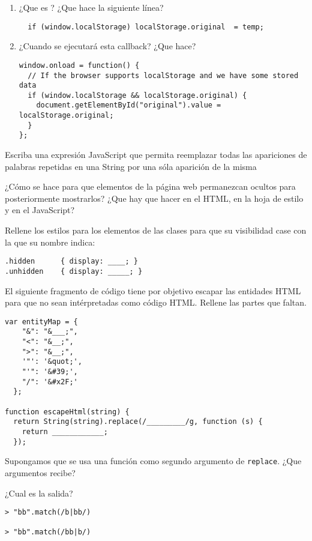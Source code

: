 \item 
\begin{enumerate}
\item 
¿Que es ? ¿Que hace la siguiente línea?
\begin{verbatim}
  if (window.localStorage) localStorage.original  = temp;
\end{verbatim}
\item  ¿Cuando se ejecutará esta callback? ¿Que hace?
\begin{verbatim}
window.onload = function() {
  // If the browser supports localStorage and we have some stored data
  if (window.localStorage && localStorage.original) {
    document.getElementById("original").value = localStorage.original;
  }
};
\end{verbatim}
\end{enumerate}

\item 
Escriba una expresión JavaScript que permita reemplazar todas las apariciones de palabras repetidas en una String por una sóla aparición de la misma
\item  ¿Cómo se hace para que elementos de la página web permanezcan ocultos para 
posteriormente mostrarlos? ¿Que hay que hacer en el HTML, en la hoja de estilo y en el JavaScript?
\item Rellene los estilos para los elementos de las clases para que su visibilidad
case con la que su nombre indica:
\begin{verbatim}
.hidden      { display: ____; }
.unhidden    { display: _____; }
\end{verbatim}
\item  El siguiente fragmento de código tiene por objetivo
escapar las entidades HTML para que no sean intérpretadas como código HTML.
Rellene las partes que faltan.
\begin{verbatim}
var entityMap = {
    "&": "&___;",
    "<": "&__;",
    ">": "&__;",
    '"': '&quot;',
    "'": '&#39;',
    "/": '&#x2F;'
  };

function escapeHtml(string) {
  return String(string).replace(/_________/g, function (s) {
    return ____________;
  });
\end{verbatim}
\item 
Supongamos que se usa una función como segundo argumento de \verb|replace|.
¿Que argumentos recibe?
\item 
¿Cual es la salida?
\begin{verbatim}
> "bb".match(/b|bb/)

> "bb".match(/bb|b/)

\end{verbatim}



